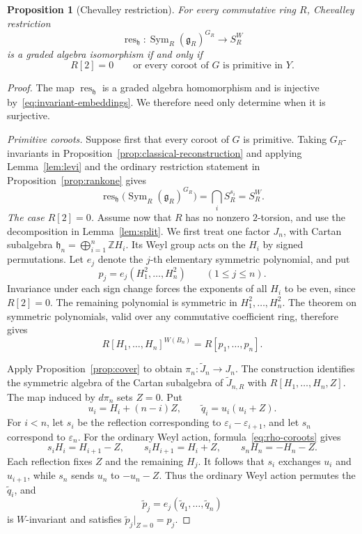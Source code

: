\documentclass[twoside,a4paper,12pt,reqno]{amsart}
\newtheorem{proposition}[theorem]{Proposition}
\theoremstyle{remark}
\numberwithin{equation}{section}
\newcommand{\Z}{\mathbb Z}
\newcommand{\fg}{\mathfrak g}
\newcommand{\fh}{\mathfrak h}
\DeclareMathOperator{\Sym}{Sym}
\begin{document}
\begin{samepage}
\begin{proposition}[Chevalley restriction]\label{prop:chevalley-criterion}
For every commutative ring \(R\), Chevalley restriction
\[
\operatorname{res}_{\fh}:
\Sym_R(\fg_R)^{G_R}\longrightarrow S_R^W
\]
is a graded algebra isomorphism if and only if
\[
R[2]=0\qquad\text{or every coroot of \(G\) is primitive in \(Y\)}.
\]
\end{proposition}
\end{samepage}
\begin{proof}
The map \(\operatorname{res}_{\fh}\) is a graded algebra homomorphism and is injective
by~\eqref{eq:invariant-embeddings}. We therefore need only determine
when it is surjective.

\smallskip
\noindent\emph{Primitive coroots.}
Suppose first that every coroot of \(G\) is primitive.
Taking \(G_R\)-invariants in Proposition~\ref{prop:classical-reconstruction}
and applying Lemma~\ref{lem:levi} and the ordinary restriction
statement in Proposition~\ref{prop:rankone} gives
\[
\operatorname{res}_{\fh}\bigl(\Sym_R(\fg_R)^{G_R}\bigr)
=\bigcap_i S_R^{s_i}=S_R^W.
\]
\smallskip
\noindent\emph{The case \(R[2]=0\).}
Assume now that \(R\) has no nonzero \(2\)-torsion, and use the
decomposition in Lemma~\ref{lem:split}.
We first treat one factor \(J_n\), with Cartan subalgebra
\(\fh_n=\bigoplus_{i=1}^n\Z H_i\).
Its Weyl group acts on the \(H_i\) by signed permutations.
Let \(e_j\) denote the \(j\)-th elementary symmetric polynomial, and put
\[
p_j=e_j(H_1^2,\ldots,H_n^2)\qquad(1\le j\le n).
\]
Invariance under each sign change forces the exponents of all \(H_i\)
to be even, since \(R[2]=0\). The remaining polynomial is symmetric
in \(H_1^2,\ldots,H_n^2\). The theorem on symmetric polynomials,
valid over any commutative coefficient ring, therefore gives
\[
R[H_1,\ldots,H_n]^{W(B_n)}=R[p_1,\ldots,p_n].
\]

Apply Proposition~\ref{prop:cover} to obtain
\(\pi_n:\widetilde J_n\to J_n\).
The construction identifies the symmetric algebra of the Cartan
subalgebra of \(\widetilde J_{n,R}\) with \(R[H_1,\ldots,H_n,Z]\).
The map induced by \(d\pi_n\) sets \(Z=0\). Put
\[
u_i=H_i+(n-i)Z,\qquad \widetilde q_i=u_i(u_i+Z).
\]
For \(i<n\), let \(s_i\) be the reflection corresponding to
\(\varepsilon_i-\varepsilon_{i+1}\), and let \(s_n\) correspond to
\(\varepsilon_n\). For the ordinary Weyl action,
formula~\eqref{eq:rho-coroots} gives
\[
s_iH_i=H_{i+1}-Z,\qquad s_iH_{i+1}=H_i+Z,\qquad
s_nH_n=-H_n-Z.
\]
Each reflection fixes \(Z\) and the remaining \(H_j\).
It follows that \(s_i\) exchanges \(u_i\) and \(u_{i+1}\), while
\(s_n\) sends \(u_n\) to \(-u_n-Z\).
Thus the ordinary Weyl action permutes the \(\widetilde q_i\), and
\[
\widetilde p_j=e_j(\widetilde q_1,\ldots,\widetilde q_n)
\]
is \(W\)-invariant and satisfies \(\widetilde p_j|_{Z=0}=p_j\).


\end{proof}
\end{document}
